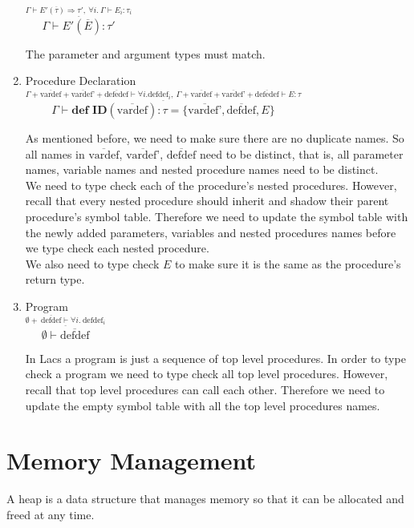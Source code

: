 \documentclass[12pt, letterpaper]{article}
\begin{document}
\begin{enumerate}
$\overset{\underline{\displaystyle \Gamma \vdash E'(\overline{\tau}) \Rightarrow \tau', \ \forall i. \ \Gamma \vdash E_i: \tau_i}}{\Gamma \vdash E'(\overline{E}): \tau'}$

The parameter and argument types must match.

\item Procedure Declaration\\

$\overset{\underline{\displaystyle \Gamma + \overline{\text{vardef}} + \overline{\text{vardef'}} + \overline{\text{defedef}} \vdash \forall i. \text{defdef}_i, \ \Gamma + \overline{\text{vardef}} + \overline{\text{vardef'}} + \overline{\text{defedef}} \vdash E: \tau}}{\Gamma \vdash \textbf{def ID}(\overline{\text{vardef}}): \tau = \{\overline{\text{vardef'}}, \overline{\text{defdef}}, E\}}$

As mentioned before, we need to make sure there are no duplicate names. So all names in \(\overline{\text{vardef}}\), \(\overline{\text{vardef'}}\), \(\overline{\text{defdef}}\) need to be distinct, that is, all parameter names, variable names and nested procedure names need to be distinct.\\

We need to type check each of the procedure's nested procedures. However, recall that every nested procedure should inherit and shadow their parent procedure's symbol table. Therefore we need to update the symbol table with the newly added parameters, variables and nested procedures names before we type check each nested procedure.\\

We also need to type check \(E\) to make sure it is the same as the procedure's return type.

\item Program\\

$\overset{\underline{\displaystyle \emptyset + \ \overline{\text{defdef}} \vdash \forall i. \ \text{defdef}_i}}{\emptyset \vdash \overline{\text{defdef}}}$

In Lacs a program is just a sequence of top level procedures. In order to type check a program we need to type check all top level procedures. However, recall that top level procedures can call each other. Therefore we need to update the empty symbol table with all the top level procedures names.
\end{enumerate}

\newpage

\section{Memory Management}
A heap is a data structure that manages memory so that it can be allocated and freed at any time.\\
\end{document}
